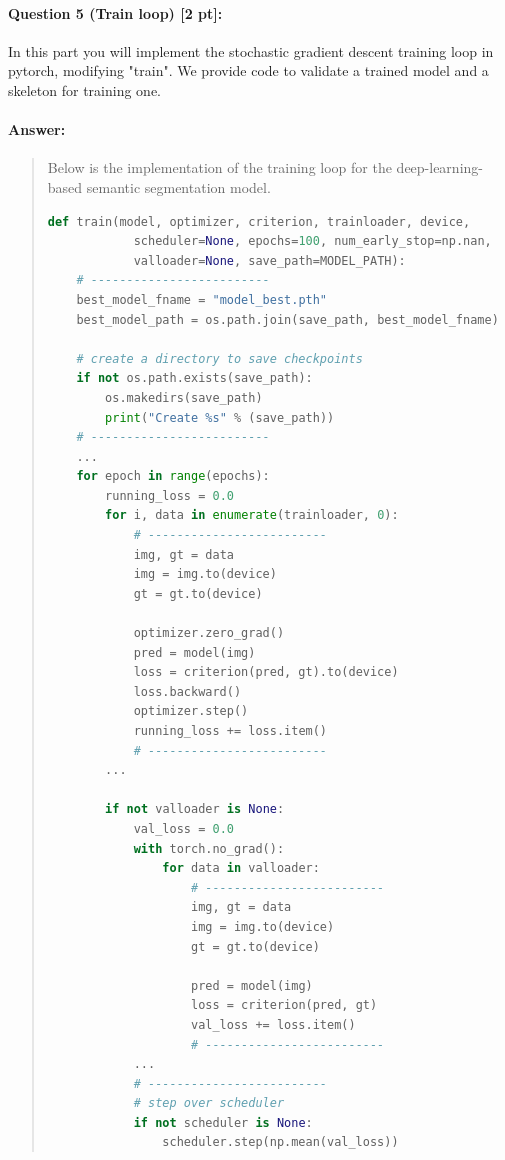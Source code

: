 \documentclass[9pt]{article}
\begin{document}
\paragraph{Question 5 (Train loop) [2 pt]:} 
In this part you will implement the stochastic gradient descent training loop in pytorch, modifying "train". We provide code to validate a trained model and a skeleton for training one. 
\paragraph{Answer:} 
\begin{quote}

Below is the implementation of the training loop for the deep-learning-based semantic segmentation model.

\begin{lstlisting}[language=Python, basicstyle=\scriptsize]
def train(model, optimizer, criterion, trainloader, device, 
            scheduler=None, epochs=100, num_early_stop=np.nan,
            valloader=None, save_path=MODEL_PATH):
    # -------------------------
    best_model_fname = "model_best.pth"
    best_model_path = os.path.join(save_path, best_model_fname)

    # create a directory to save checkpoints
    if not os.path.exists(save_path):
        os.makedirs(save_path)
        print("Create %s" % (save_path))
    # -------------------------
    ...
    for epoch in range(epochs):
        running_loss = 0.0
        for i, data in enumerate(trainloader, 0):
            # -------------------------
            img, gt = data
            img = img.to(device)
            gt = gt.to(device)
            
            optimizer.zero_grad()
            pred = model(img)
            loss = criterion(pred, gt).to(device)
            loss.backward()
            optimizer.step()
            running_loss += loss.item()
            # -------------------------
        ...

        if not valloader is None:
            val_loss = 0.0
            with torch.no_grad():
                for data in valloader:
                    # -------------------------
                    img, gt = data
                    img = img.to(device)
                    gt = gt.to(device)
                    
                    pred = model(img)
                    loss = criterion(pred, gt)
                    val_loss += loss.item()
                    # -------------------------
            ...
            # -------------------------
            # step over scheduler
            if not scheduler is None:
                scheduler.step(np.mean(val_loss))


\end{lstlisting}
\end{quote}
\end{document}
